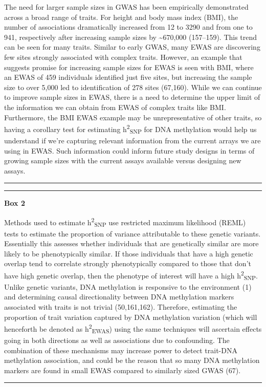 \documentclass[11pt,oneside]{bristolthesis}
\begin{document}
The need for larger sample sizes in GWAS has been empirically demonstrated across a broad range of traits. For height and body mass index (BMI), the number of associations dramatically increased from 12 to 3290 and from one to 941, respectively after increasing sample sizes by \textasciitilde670,000 (157--159). This trend can be seen for many traits. Similar to early GWAS, many EWAS are discovering few sites strongly associated with complex traits. However, an example that suggests promise for increasing sample sizes for EWAS is seen with BMI, where an EWAS of 459 individuals identified just five sites, but increasing the sample size to over 5,000 led to identification of 278 sites (67,160). While we can continue to improve sample sizes in EWAS, there is a need to determine the upper limit of the information we can obtain from EWAS of complex traits like BMI. Furthermore, the BMI EWAS example may be unrepresentative of other traits, so having a corollary test for estimating h\textsuperscript{2}\textsubscript{SNP} for DNA methylation would help us understand if we're capturing relevant information from the current arrays we are using in EWAS. Such information could inform future study designs in terms of growing sample sizes with the current assays available versus designing new assays.
\begin{center}\rule{0.5\linewidth}{0.5pt}\end{center}
\begin{center}\rule{0.5\linewidth}{0.5pt}\end{center}

\textbf{Box 2}

Methods used to estimate h\textsuperscript{2}\textsubscript{SNP} use restricted maximum likelihood (REML) tests to estimate the proportion of variance attributable to these genetic variants. Essentially this assesses whether individuals that are genetically similar are more likely to be phenotypically similar. If those individuals that have a high genetic overlap tend to correlate strongly phenotypically compared to those that don't have high genetic overlap, then the phenotype of interest will have a high h\textsuperscript{2}\textsubscript{SNP}. Unlike genetic variants, DNA methylation is responsive to the environment (1) and determining causal directionality between DNA methylation markers associated with traits is not trivial (50,161,162). Therefore, estimating the proportion of trait variation captured by DNA methylation variation (which will henceforth be denoted as h\textsuperscript{2}\textsubscript{EWAS}) using the same techniques will ascertain effects going in both directions as well as associations due to confounding. The combination of these mechanisms may increase power to detect trait-DNA methylation association, and could be the reason that so many DNA methylation markers are found in small EWAS compared to similarly sized GWAS (67).
\begin{center}\rule{0.5\linewidth}{0.5pt}\end{center}
\end{document}
